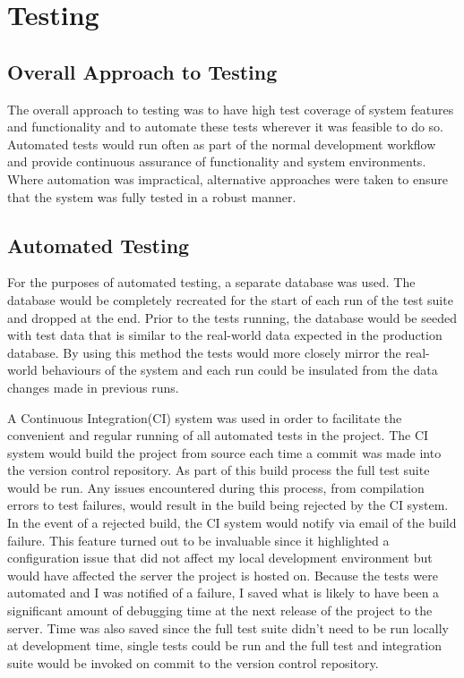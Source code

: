 \chapter{Testing}

\section{Overall Approach to Testing}

The overall approach to testing was to have high test coverage of system features and functionality and to automate these tests wherever it was feasible to do so. Automated tests would run often as part of the normal development workflow and provide continuous assurance of functionality and system environments. Where automation was impractical, alternative approaches were taken to ensure that the system was fully tested in a robust manner.

\section{Automated Testing}

For the purposes of automated testing, a separate database was used. The database would be completely recreated for the start of each run of the test suite and dropped at the end. Prior to the tests running, the database would be seeded with test data that is similar to the real-world data expected in the production database. By using this method the tests would more closely mirror the real-world behaviours of the system and each run could be insulated from the data changes made in previous runs.

A Continuous Integration(CI) system was used in order to facilitate the convenient and regular running of all automated tests in the project. The CI system would build the project from source each time a commit was made into the version control repository. As part of this build process the full test suite would be run. Any issues encountered during this process, from compilation errors to test failures, would result in the build being rejected by the CI system. In the event of a rejected build, the CI system would notify via email of the build failure. This feature turned out to be invaluable since it highlighted a configuration issue that did not affect my local development environment but would have affected the server the project is hosted on. Because the tests were automated and I was notified of a failure, I saved what is likely to have been a significant amount of debugging time at the next release of the project to the server. Time was also saved since the full test suite didn't need to be run locally at development time, single tests could be run and the full test and integration suite would be invoked on commit to the version control repository. 

